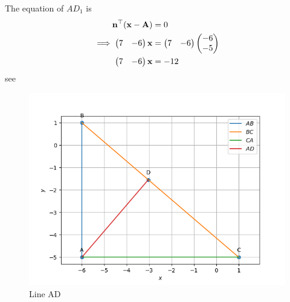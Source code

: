 \documentclass[11pt]{book}
\begin{document}
\begin{enumerate}[label=\thesection.\arabic*.,ref=\thesection.\theenumi]
The equation of $AD_1$ is
\begin{align}
 \mathbf{n}^{\top}(\mathbf{x-A}) &= 0 \\
\implies \begin{pmatrix}7 & -6\end{pmatrix}\mathbf{x} &= \begin{pmatrix}7 & -6\end{pmatrix}\begin{pmatrix}-6 \\ -5\end{pmatrix}\\
\begin{pmatrix}7 & -6\end{pmatrix}\mathbf{x} &= -12
\end{align}
see 
\begin{figure}[H]
    \centering
    \includegraphics{figs/AD_line.png}
    \caption{Line AD}
    \label{fig:line_ad}
\end{figure}
 

\end{enumerate}
\end{document}
